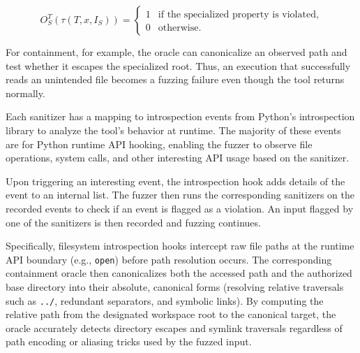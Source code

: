 \[
O_S^T(\tau(T,x,I_S)) =
\begin{cases}
1 & \text{if the specialized property is violated},\\
0 & \text{otherwise}.
\end{cases}
\]

For containment, for example, the oracle can canonicalize an observed path and
test whether it escapes the specialized root. Thus, an execution that
successfully reads an unintended file becomes a fuzzing failure even though
the tool returns normally.

Each sanitizer has a mapping to introspection events from Python's introspection library to analyze the tool's behavior at runtime. The majority of these events are for Python runtime API hooking, enabling the fuzzer to observe file operations, system calls, and other interesting API usage based on the sanitizer.

Upon triggering an interesting event, the introspection hook adds details of the event to an internal list. The fuzzer then runs the corresponding sanitizers on the recorded events to check if an event is flagged as a violation. An input flagged by one of the sanitizers is then recorded and fuzzing continues.

Specifically, filesystem introspection hooks intercept raw file paths at the runtime API boundary (e.g., \texttt{open}) before path resolution occurs. The corresponding containment oracle then canonicalizes both the accessed path and the authorized base directory into their absolute, canonical forms (resolving relative traversals such as \texttt{../}, redundant separators, and symbolic links). By computing the relative path from the designated workspace root to the canonical target, the oracle accurately detects directory escapes and symlink traversals regardless of path encoding or aliasing tricks used by the fuzzed input.

